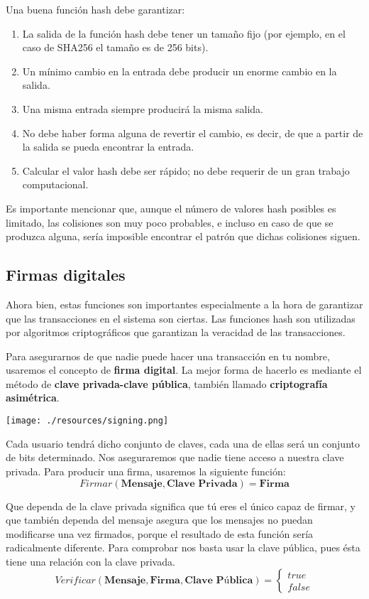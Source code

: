\documentclass[10pt, a4paper]{article}
\theoremstyle{theorem-style}
\theoremstyle{theorem-style}
\theoremstyle{definition-style}
\theoremstyle{remark-style}
\theoremstyle{example-style}
\theoremstyle{definition-style}
\theoremstyle{remark-style}
\begin{document}
Una buena función hash debe garantizar:

\begin{enumerate}
\item
	La salida de la función hash debe tener un tamaño fijo (por ejemplo, en el caso de SHA256 el tamaño es de 256 bits).
\item
	Un mínimo cambio en la entrada debe producir un enorme cambio en la salida.
\item
	Una misma entrada siempre producirá la misma salida.
\item
	No debe haber forma alguna de revertir el cambio, es decir, de que a partir de la salida se pueda encontrar la entrada.
\item
	Calcular el valor hash debe ser rápido; no debe requerir de un gran trabajo computacional.
\end{enumerate}

Es importante mencionar que, aunque el número de valores hash posibles es limitado, las colisiones son muy poco probables, e incluso en caso de que se produzca alguna, sería imposible encontrar el patrón que dichas colisiones siguen.
\subsection{Firmas digitales}

Ahora bien, estas funciones son importantes especialmente a la hora de garantizar que las transacciones en el sistema son ciertas. Las funciones hash son utilizadas por algoritmos criptográficos que garantizan la veracidad de las transacciones.

Para asegurarnos de que nadie puede hacer una transacción en tu nombre, usaremos el concepto de \textbf{firma digital}. La mejor forma de hacerlo es mediante el método de \textbf{clave privada-clave pública}, también llamado \textbf{criptografía asimétrica}.

\begin{center}
	\texttt{[image: ./resources/signing.png]}
\end{center}

Cada usuario tendrá dicho conjunto de claves, cada una de ellas será un conjunto de bits determinado. Nos aseguraremos que nadie tiene acceso a nuestra clave privada. Para producir una firma, usaremos la siguiente función:
$$
Firmar(\textbf{Mensaje}, \textbf{Clave Privada}) = \textbf{Firma}
$$

Que dependa de la clave privada significa que tú eres el único capaz de firmar, y que también dependa del mensaje asegura que los mensajes no puedan modificarse una vez firmados, porque el resultado de esta función sería radicalmente diferente. Para comprobar nos basta usar la clave pública, pues ésta tiene una relación con la clave privada.
$$
Verificar(\textbf{Mensaje}, \textbf{Firma}, \textbf{Clave Pública}) = \begin{cases} true \\ false \end{cases}
$$
\end{document}

